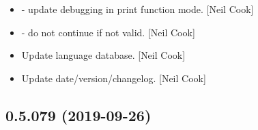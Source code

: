 \documentclass[a4paper,10pt,english]{report}
\begin{document}
\begin{itemize}
\item {} 
 - update debugging in print function mode. {[}Neil
Cook{]}

\item {} 
 - do not continue if not valid. {[}Neil Cook{]}

\item {} 
Update language database. {[}Neil Cook{]}

\item {} 
Update date/version/changelog. {[}Neil Cook{]}

\end{itemize}


\subsection{0.5.079 (2019-09-26)}
\end{document}
